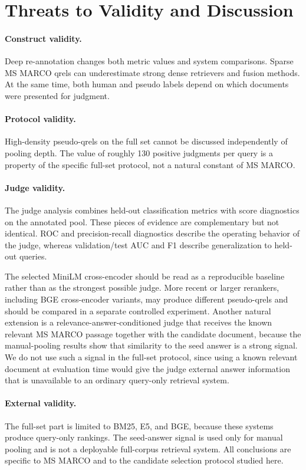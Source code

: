 \documentclass[runningheads,a4paper]{llncs}
\begin{document}
\section{Threats to Validity and Discussion}

\paragraph{Construct validity.}
Deep re-annotation changes both metric values and system comparisons. Sparse MS MARCO qrels can underestimate strong dense retrievers and fusion methods. At the same time, both human and pseudo labels depend on which documents were presented for judgment.

\paragraph{Protocol validity.}
High-density pseudo-qrels on the full set cannot be discussed independently of pooling depth. The value of roughly 130 positive judgments per query is a property of the specific full-set protocol, not a natural constant of MS MARCO.

\paragraph{Judge validity.}
The judge analysis combines held-out classification metrics with score diagnostics on the annotated pool. These pieces of evidence are complementary but not identical. ROC and precision-recall diagnostics describe the operating behavior of the judge, whereas validation/test AUC and F1 describe generalization to held-out queries.

The selected MiniLM cross-encoder should be read as a reproducible baseline rather than as the strongest possible judge. More recent or larger rerankers, including BGE cross-encoder variants, may produce different pseudo-qrels and should be compared in a separate controlled experiment. Another natural extension is a relevance-answer-conditioned judge that receives the known relevant MS MARCO passage together with the candidate document, because the manual-pooling results show that similarity to the seed answer is a strong signal. We do not use such a signal in the full-set protocol, since using a known relevant document at evaluation time would give the judge external answer information that is unavailable to an ordinary query-only retrieval system.

\paragraph{External validity.}
The full-set part is limited to BM25, E5, and BGE, because these systems produce query-only rankings. The seed-answer signal is used only for manual pooling and is not a deployable full-corpus retrieval system. All conclusions are specific to MS MARCO and to the candidate selection protocol studied here.
\end{document}
